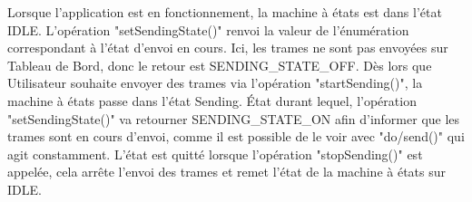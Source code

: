 \newline
Lorsque l'application {\nomApplication} est en fonctionnement, la machine à états est dans l'état IDLE. L'opération "setSendingState()" renvoi la valeur de l'énumération correspondant à l'état d'envoi en cours. Ici, les trames ne sont pas envoyées sur Tableau de Bord, donc le retour est SENDING\_STATE\_OFF. \newline
Dès lors que Utilisateur souhaite envoyer des trames via l'opération "startSending()", la machine à états passe dans l'état Sending. État durant lequel, l'opération "setSendingState()" va retourner SENDING\_STATE\_ON afin d'informer que les trames sont en cours d'envoi, comme il est possible de le voir avec "do/send()" qui agit constamment. L'état est quitté lorsque l'opération "stopSending()" est appelée, cela arrête l'envoi des trames et remet l'état de la machine à états sur IDLE.\newline 